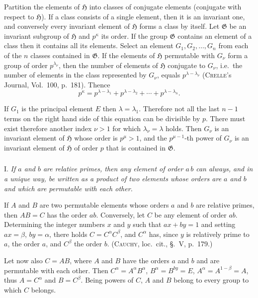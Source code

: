 \documentclass[a5paper,12pt]{article}
\newcommand{\secformat}[1]{\centering{\normalfont\normalsize{#1}}}
\let\fr\mathfrak
\newcommand{\CG}{\fr{G}}
\newcommand{\CH}{\fr{H}}
\newcommand{\?}{{\color{blue}${}^{(?)}$}}
\newcounter{origpagecounter}{}
\newcommand{\origpagebreak}{\mark{\arabic{origpagecounter}}\addtocounter{origpagecounter}{1}\mark{\arabic{origpagecounter}}}
\begin{document}

Partition the elements of $\CH$
into classes of conjugate elements
(conjugate with respect to $\CH$).
%
%
If a class consists of a single element,
then it is an invariant one,
and conversely
every invariant element of $\CH$ forms a class by itself.
%
%
Let $\CG$ be an invariant subgroup of $\CH$
and $p^\kappa$ its order.
%
%
If the group $\CG$ contains an element of a class
then it contains all its elements.
%
%
Select an element $G_1, G_2, \ldots, G_n$
from each of the $n$ classes contained in $\CG$. %
%
%
If the elements of $\CH$ permutable with $G_\nu$
form a group of order $p^{\lambda_\nu}$,
then the number of elements
of $\CH$ conjugate to $G_\nu$,
i.e.~the number of elements
in the class represented by $G_\nu$, %
equals $p^{\lambda - \lambda_\nu}$
(\textsc{Crelle}'s Journal, Vol.~100, p.~181).
%
%
Thence
\[
	p^\kappa
	=
	p^{\lambda - \lambda_1}
	+
	p^{\lambda - \lambda_2}
	+
	\cdots
	+
	p^{\lambda - \lambda_n}
	.
\]


If $G_1$ is the principal element $E$
then $\lambda = \lambda_1$.
%
%
Therefore
not all the last $n-1$ terms
on the right hand side of this equation
can be divisible by $p$.
%
%
There must exist therefore another index $\nu > 1$
for which $\lambda_\nu = \lambda$ holds.
%
%
Then $G_\nu$ is an invariant element of $\CH$
whose order is $p^\mu > 1$,
and
the $p^{\mu-1}$-th power of $G_\nu$
is an invariant element of $\CH$ of order $p$
that is contained in $\CG$.


\subsubsection*{\secformat{\S.~2.}}


I.
%
\label{t:2-1}
%
\emph{ %
If $a$ and $b$ are relative primes,
then any element of order $a \, b$
can always, and in a unique way,
be written
as a product of two elements
whose orders are $a$ and $b$
and
which are permutable with each other.
}


If $A$ and $B$ are two permutable elements
whose orders $a$ and $b$ are relative primes,
then $A B = C$ has the order $a b$.
%
%
Conversely, let $C$ be any element of order $a b$.
%
Determining the integer numbers $x$ and $y$
such that $a x + b y = 1$
and
setting $a x = \beta$, $b y = \alpha$,
there holds $C = C^\alpha C^\beta$,
and $C^\alpha$ has,
since $y$ is relatively prime to $a$,
the order $a$,
and $C^\beta$ the order $b$.
%
%
(\textsc{Cauchy}, loc.~cit., \S.~V, p.~179.)
%
%
\origpagebreak
%
%
Let now also $C = A B$,
where $A$ and $B$ have the orders $a$ and $b$
and are permutable with each other.
%
%
Then
$C^\alpha = A^\alpha B^\alpha$,
$B^\alpha = B^{b y} = E$,
$A^\alpha = A^{1-\beta} = A$,
thus
$A = C^\alpha$ and $B = C^\beta$.
%
%
Being powers of $C$,
$A$ and $B$ belong to every group
to which $C$ belongs.
\end{document}
